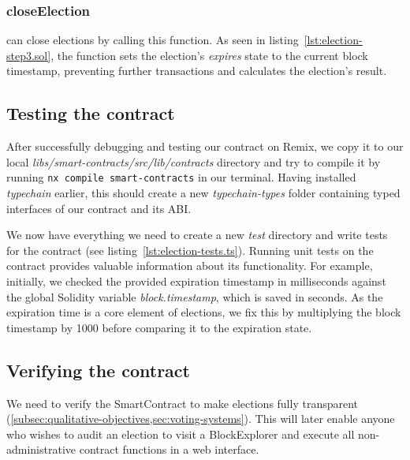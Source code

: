 \subsubsection{closeElection}

 can close elections by calling this function.
As seen in listing~\ref{lst:election-step3.sol}, the function sets the election's \emph{expires} state to the current block timestamp, preventing further transactions and calculates the election's result.

\subsection{Testing the contract}\label{subsec:testing-the-contract}

After successfully debugging and testing our contract on Remix, we copy it to our local \emph{libs/smart-contracts/src/lib/contracts} directory and try to compile it by running \texttt{nx compile smart-contracts} in our terminal.
Having installed \emph{typechain} earlier, this should create a new \emph{typechain-types} folder containing typed interfaces of our contract and its \gls{ABI}.

We now have everything we need to create a new \emph{test} directory and write tests for the contract (see listing~\ref{lst:election-tests.ts}).
Running unit tests on the contract provides valuable information about its functionality.
For example, initially, we checked the provided expiration timestamp in milliseconds against the global Solidity variable \emph{block.timestamp}, which is saved in seconds.
As the expiration time is a core element of elections, we fix this by multiplying the block timestamp by 1000 before comparing it to the expiration state.


\subsection{Verifying the contract}\label{subsec:verifying-the-contract}

We need to verify the \gls{SmartContract} to make elections fully transparent (\cref{subsec:qualitative-objectives,sec:voting-systems}).
This will later enable anyone who wishes to audit an election to visit a \gls{BlockExplorer} and execute all non-administrative contract functions in a web interface.

